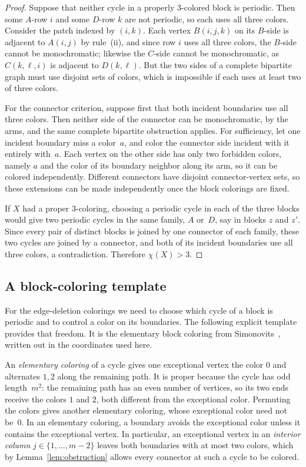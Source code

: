 \documentclass[11pt,letterpaper]{article}
\numberwithin{equation}{section}
\theoremstyle{plain}
\theoremstyle{definition}
\theoremstyle{remark}
\begin{document}
\begin{proof}
Suppose that neither cycle in a properly $3$-colored block is periodic. Then some $A$-row $i$ and some $D$-row $k$ are not periodic, so each uses all three colors. Consider the patch indexed by $(i,k)$. Each vertex $B(i,j,k)$ on its $B$-side is adjacent to $A(i,j)$ by rule~(ii), and since row $i$ uses all three colors, the $B$-side cannot be monochromatic; likewise the $C$-side cannot be monochromatic, as $C(k,\ell,i)$ is adjacent to $D(k,\ell)$. But the two sides of a complete bipartite graph must use disjoint sets of colors, which is impossible if each uses at least two of three colors.

For the connector criterion, suppose first that both incident boundaries use all three colors. Then neither side of the connector can be monochromatic, by the arms, and the same complete bipartite obstruction applies. For sufficiency, let one incident boundary miss a color~$a$, and color the connector side incident with it entirely with~$a$. Each vertex on the other side has only two forbidden colors, namely $a$ and the color of its boundary neighbor along its arm, so it can be colored independently. Different connectors have disjoint connector-vertex sets, so these extensions can be made independently once the block colorings are fixed.

If $X$ had a proper $3$-coloring, choosing a periodic cycle in each of the three blocks would give two periodic cycles in the same family, $A$ or~$D$, say in blocks $z$ and $z'$. Since every pair of distinct blocks is joined by one connector of each family, these two cycles are joined by a connector, and both of its incident boundaries use all three colors, a contradiction. Therefore $\chi(X)>3$.
\end{proof}

\subsection{A block-coloring template}\label{sec:template}

For the edge-deletion colorings we need to choose which cycle of a block is periodic and to control a color on its boundaries. The following explicit template provides that freedom. It is the elementary block coloring from Simonovits~\cite[pp.~75--76]{Simonovits}, written out in the coordinates used here.

An \emph{elementary coloring} of a cycle gives one exceptional vertex the color $0$ and alternates $1,2$ along the remaining path. It is proper because the cycle has odd length~$m^2$: the remaining path has an even number of vertices, so its two ends receive the colors $1$ and $2$, both different from the exceptional color. Permuting the colors gives another elementary coloring, whose exceptional color need not be~$0$. In an elementary coloring, a boundary avoids the exceptional color unless it contains the exceptional vertex. In particular, an exceptional vertex in an \emph{interior column} $j\in\{1,\dots,m-2\}$ leaves both boundaries with at most two colors, which by Lemma~\ref{lem:obstruction} allows every connector at such a cycle to be colored.
\end{document}
